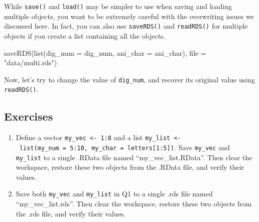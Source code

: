 \documentclass[
]{book}
\newenvironment{Shaded}{\begin{snugshade}}{\end{snugshade}}
\newcommand{\AttributeTok}[1]{\textcolor[rgb]{0.77,0.63,0.00}{#1}}
\newcommand{\CommentTok}[1]{\textcolor[rgb]{0.56,0.35,0.01}{\textit{#1}}}
\newcommand{\DecValTok}[1]{\textcolor[rgb]{0.00,0.00,0.81}{#1}}
\newcommand{\FunctionTok}[1]{\textcolor[rgb]{0.00,0.00,0.00}{#1}}
\newcommand{\NormalTok}[1]{#1}
\newcommand{\OtherTok}[1]{\textcolor[rgb]{0.56,0.35,0.01}{#1}}
\newcommand{\SpecialCharTok}[1]{\textcolor[rgb]{0.00,0.00,0.00}{#1}}
\newcommand{\StringTok}[1]{\textcolor[rgb]{0.31,0.60,0.02}{#1}}
\providecommand{\tightlist}{%
  \setlength{\itemsep}{0pt}\setlength{\parskip}{0pt}}
\begin{document}
While \texttt{save()} and \texttt{load()} may be simpler to use when saving and loading multiple objects, you want to be extremely careful with the overwriting issues we discussed here. In fact, you can also use \texttt{saveRDS()} and \texttt{readRDS()} for multiple objects if you create a list containing all the objects.

\begin{Shaded}
\begin{Highlighting}[]
\FunctionTok{saveRDS}\NormalTok{(}\FunctionTok{list}\NormalTok{(}\AttributeTok{dig\_num =}\NormalTok{ dig\_num, }\AttributeTok{ani\_char =}\NormalTok{ ani\_char), }\AttributeTok{file =} \StringTok{"data/multi.rds"}\NormalTok{)}
\end{Highlighting}
\end{Shaded}

Now, let's try to change the value of \texttt{dig\_num}, and recover its original value using \texttt{readRDS()}.

\begin{Shaded}
\end{Shaded}

\hypertarget{exercises-30}{%
\subsection{Exercises}\label{exercises-30}}

\begin{enumerate}
\def\labelenumi{\arabic{enumi}.}
\tightlist
\item
  Define a vector \texttt{my\_vec\ \textless{}-\ 1:8} and a list \texttt{my\_list\ \textless{}-\ list(my\_num\ =\ 5:10,\ my\_char\ =\ letters{[}1:5{]})}. Save \texttt{my\_vec} and \texttt{my\_list} to a single .RData file named ``my\_vec\_list.RData''. Then clear the workspace, restore these two objects from the .RData file, and verify their values.
\item
  Save both \texttt{my\_vec} and \texttt{my\_list} in Q1 to a single .rds file named ``my\_vec\_list.rds''. Then clear the workspace, restore these two objects from the .rds file, and verify their values.
\end{enumerate}
\end{document}
